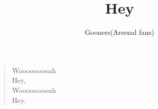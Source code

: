 \documentclass[a4paper,12pt]{article}
\title{Hey}
\author{Gooners(Arsenal fans)}
\date{}
\begin{document}
	
	\maketitle
	
	\begin{verse}
		
		Wooooooooah \\
		Hey, \\
		Wooooooooah \\
		Hey.
		
	\end{verse}
	
\end{document}
